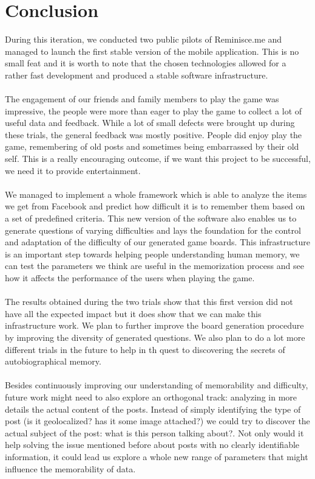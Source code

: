 \chapter{Conclusion}
During this iteration, we conducted two public pilots of Reminisce.me and managed to launch the first stable version of the mobile application. This is no small feat and it is worth to note that the chosen technologies allowed for a rather fast development and produced a stable software infrastructure.\\\\
The engagement of our friends and family members to play the game was impressive, the people were more than eager to play the game to collect a lot of useful data and feedback. While a lot of small defects were brought up during these trials, the general feedback was mostly positive. People did enjoy play the game, remembering of old posts and sometimes being embarrassed by their old self. This is a really encouraging outcome, if we want this project to be successful, we need it to provide entertainment.\\\\
We managed to implement a whole framework which is able to analyze the items we get from Facebook and predict how difficult it is to remember them based on a set of predefined criteria. This new version of the software also enables us to generate questions of varying difficulties and lays the foundation for the control and adaptation of the difficulty of our generated game boards. This infrastructure is an important step towards helping people understanding human memory, we can test the parameters we think are useful in the memorization process and see how it affects the performance of the users when playing the game.\\\\
The results obtained during the two trials show that this first version did not have all the expected impact but it does show that we can make this infrastructure work. We plan to further improve the board generation procedure by improving the diversity of generated questions. We also plan to do a lot more different trials in the future to help in th quest to discovering the secrets of autobiographical memory.\\\\
Besides continuously improving our understanding of memorability and difficulty, future work might need to also explore an orthogonal track: analyzing in more details the actual content of the posts. Instead of simply identifying the type of post (is it geolocalized? has it some image attached?) we could try to discover the actual subject of the post: what is this person talking about?. Not only would it help solving the issue mentioned before about posts with no clearly identifiable information, it could lead us explore a whole new range of parameters that might influence the memorability of data.\\\\
